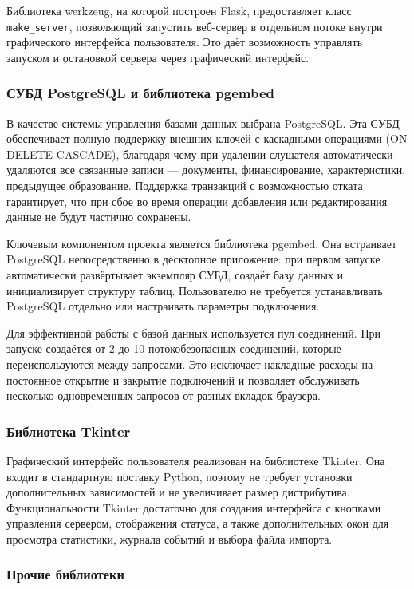Библиотека werkzeug, на которой построен Flask, предоставляет класс \texttt{make\_server}, позволяющий запустить веб-сервер в отдельном потоке внутри графического интерфейса пользователя. Это даёт возможность управлять запуском и остановкой сервера через графический интерфейс.

\subsubsection{СУБД PostgreSQL и библиотека pgembed}

В качестве системы управления базами данных выбрана PostgreSQL. Эта СУБД обеспечивает полную поддержку внешних ключей с каскадными операциями (ON DELETE CASCADE), благодаря чему при удалении слушателя автоматически удаляются все связанные записи — документы, финансирование, характеристики, предыдущее образование. Поддержка транзакций с возможностью отката гарантирует, что при сбое во время операции добавления или редактирования данные не будут частично сохранены.

Ключевым компонентом проекта является библиотека pgembed. Она встраивает PostgreSQL непосредственно в десктопное приложение: при первом запуске автоматически развёртывает экземпляр СУБД, создаёт базу данных и инициализирует структуру таблиц. Пользователю не требуется устанавливать PostgreSQL отдельно или настраивать параметры подключения.

Для эффективной работы с базой данных используется пул соединений. При запуске создаётся от 2 до 10 потокобезопасных соединений, которые переиспользуются между запросами. Это исключает накладные расходы на постоянное открытие и закрытие подключений и позволяет обслуживать несколько одновременных запросов от разных вкладок браузера.

\subsubsection{Библиотека Tkinter}

Графический интерфейс пользователя реализован на библиотеке Tkinter. Она входит в стандартную поставку Python, поэтому не требует установки дополнительных зависимостей и не увеличивает размер дистрибутива. Функциональности Tkinter достаточно для создания интерфейса с кнопками управления сервером, отображения статуса, а также дополнительных окон для просмотра статистики, журнала событий и выбора файла импорта.

\subsubsection{Прочие библиотеки}

